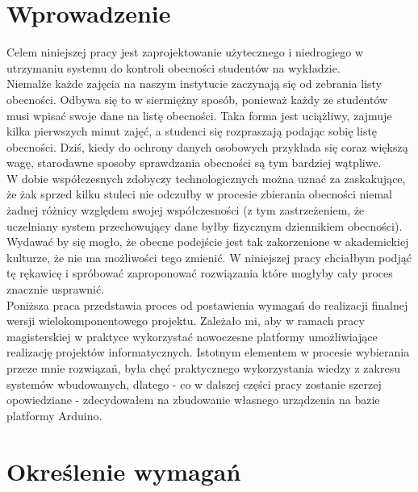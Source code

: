 \documentclass[declaration,shortabstract, mgr]{iithesis}
\author {Dawid Szczyrk}
\begin{document}
\chapter{Wprowadzenie}

Celem niniejszej pracy jest zaprojektowanie użytecznego i niedrogiego w utrzymaniu systemu do kontroli obecności studentów na wykładzie.\\
\indent Niemalże każde zajęcia na naszym instytucie zaczynają się od zebrania listy obecności. Odbywa się to w siermiężny sposób, ponieważ każdy ze studentów musi wpisać swoje dane na listę obecności.
Taka forma jest uciążliwy, zajmuje kilka pierwszych minut zajęć, a studenci się rozpraszają podając sobię listę obecności. Dziś, kiedy do ochrony danych osobowych przykłada się
coraz większą wagę, starodawne sposoby sprawdzania obecności są tym bardziej wątpliwe.\\
\indent W dobie współczesnych zdobyczy technologicznych można uznać za zaskakujące, że żak sprzed kilku stuleci nie odczułby w procesie zbierania obecności niemal żadnej różnicy względem swojej współczesności (z tym zastrzeżeniem, że uczelniany system przechowujący dane byłby fizycznym dziennikiem obecności). Wydawać by się mogło, że obecne podejście jest tak zakorzenione w akademickiej kulturze, że nie ma możliwości tego zmienić. W niniejszej pracy chciałbym podjąć tę rękawicę i spróbować zaproponować rozwiązania które mogłyby cały proces znacznie usprawnić. \\
\indent Poniższa praca przedstawia proces od postawienia wymagań do realizacji finalnej wersji wielokomponentowego projektu. Zależało mi, aby w ramach pracy magisterskiej w praktyce wykorzystać nowoczesne platformy umożliwiające realizację projektów informatycznych.
\indent Istotnym elementem w procesie wybierania przeze mnie rozwiązań, była chęć praktycznego wykorzystania wiedzy z zakresu systemów wbudowanych, dlatego - co w dalszej części pracy zostanie szerzej opowiedziane - zdecydowałem na zbudowanie własnego urządzenia na bazie platformy Arduino.


\chapter{Określenie wymagań}
\end{document}
